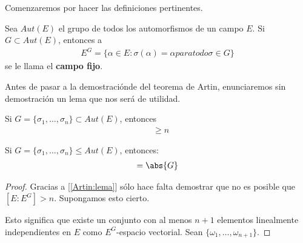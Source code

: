 ﻿Comenzaremos por hacer las definiciones pertinentes.\par\null

\begin{definicion}
    Sea $Aut(E)$ el grupo de todos los automorfismos de un campo $E$. Si $G \subset Aut(E)$, 
    entonces a
    \begin{align}
        E^G = \{  \alpha \in E : \sigma(\alpha) = \alpha para todo \sigma \in G \}
    \end{align}
    se le llama el \textbf{campo fijo}.
\end{definicion}

Antes de pasar a la demostraciónde del teorema de Artin, enunciaremos sin demostración un lema que nos
será de utilidad.

\begin{lema}\label{Artin:lema}
    Si $G = \{ \sigma_1, \dots, \sigma_n \} \subset Aut(E)$, entonces
    \begin{align}
        [E:E^G]     &\geq   n
    \end{align}
\end{lema}\par\null

\begin{teorema}[Artin]
    Si $G=\{ \sigma_1, \dots, \sigma_n \} \leq Aut(E)$, entonces:
    \begin{align}
        [E : E^G]   =   \abs{G}
    \end{align}
\end{teorema}

\begin{proof}
    Gracias a [\ref{Artin:lema}] sólo hace falta demostrar que no es posible que $[E : E^G] > n$.
    Supongamos esto cierto.\par\null
        
    Esto significa que existe un conjunto con al menos $n+1$ elementos linealmente independientes en $E$ como
    $E^G$-espacio vectorial. Sean $\{ \omega_1, \dots, \omega_{n+1} \}$.\par\null
    
    
\end{proof}